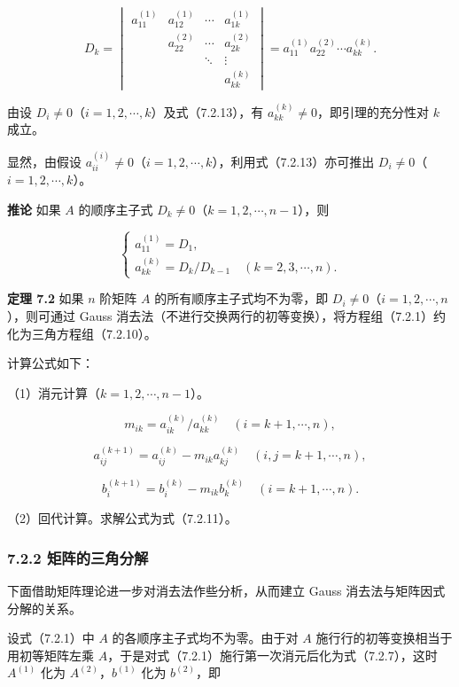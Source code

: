 \[
D_k=\begin{vmatrix}
a_{11}^{(1)}&a_{12}^{(1)}&\cdots&a_{1k}^{(1)}\\
&a_{22}^{(2)}&\cdots&a_{2k}^{(2)}\\
&&\ddots&\vdots\\
&&&a_{kk}^{(k)}
\end{vmatrix}
=a_{11}^{(1)}a_{22}^{(2)}\cdots a_{kk}^{(k)}.
\tag{7.2.13}
\]

由设 \(D_i\ne0\)（\(i=1,2,\cdots,k\)）及式（7.2.13），有 \(a_{kk}^{(k)}\ne0\)，即引理的充分性对 \(k\) 成立。

显然，由假设 \(a_{ii}^{(i)}\ne0\)（\(i=1,2,\cdots,k\)），利用式（7.2.13）亦可推出 \(D_i\ne0\)（\(i=1,2,\cdots,k\)）。

\textbf{推论} 如果 \(A\) 的顺序主子式 \(D_k\ne0\)（\(k=1,2,\cdots,n-1\)），则

\[
\begin{cases}
a_{11}^{(1)}=D_1,\\
a_{kk}^{(k)}=D_k/D_{k-1}\quad(k=2,3,\cdots,n).
\end{cases}
\]

\textbf{定理 7.2} 如果 \(n\) 阶矩阵 \(A\) 的所有顺序主子式均不为零，即 \(D_i\ne0\)（\(i=1,2,\cdots,n\)），则可通过 Gauss 消去法（不进行交换两行的初等变换），将方程组（7.2.1）约化为三角方程组（7.2.10）。

计算公式如下：

（1）消元计算（\(k=1,2,\cdots,n-1\)）。

\[m_{ik}=a_{ik}^{(k)}/a_{kk}^{(k)}\quad(i=k+1,\cdots,n),\]

\[a_{ij}^{(k+1)}=a_{ij}^{(k)}-m_{ik}a_{kj}^{(k)}\quad(i,j=k+1,\cdots,n),\]

\[b_i^{(k+1)}=b_i^{(k)}-m_{ik}b_k^{(k)}\quad(i=k+1,\cdots,n).\]

（2）回代计算。求解公式为式（7.2.11）。

\subsubsection{7.2.2 矩阵的三角分解}\label{ch07a-ux77e9ux9635ux7684ux4e09ux89d2ux5206ux89e3}

下面借助矩阵理论进一步对消去法作些分析，从而建立 Gauss 消去法与矩阵因式分解的关系。

设式（7.2.1）中 \(A\) 的各顺序主子式均不为零。由于对 \(A\) 施行行的初等变换相当于用初等矩阵左乘 \(A\)，于是对式（7.2.1）施行第一次消元后化为式（7.2.7），这时 \(A^{(1)}\) 化为 \(A^{(2)}\)，\(b^{(1)}\) 化为 \(b^{(2)}\)，即

